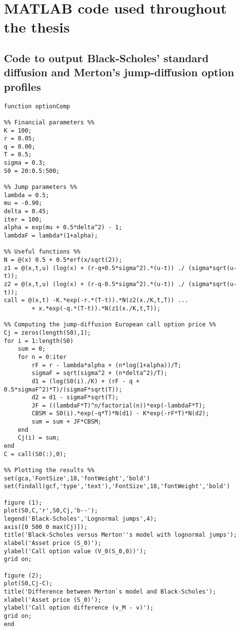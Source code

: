 \chapter{MATLAB code used throughout the thesis}

\section{Code to output Black-Scholes' standard diffusion and Merton's jump-diffusion option profiles}
\begin{lstlisting}
function optionComp

%% Financial parameters %%
K = 100;
r = 0.05;
q = 0.00;
T = 0.5;
sigma = 0.3;
S0 = 20:0.5:500;

%% Jump parameters %%
lambda = 0.5;
mu = -0.90;
delta = 0.45;
iter = 100;
alpha = exp(mu + 0.5*delta^2) - 1;
lambdaF = lambda*(1+alpha);

%% Useful functions %%
N = @(x) 0.5 + 0.5*erf(x/sqrt(2));
z1 = @(x,t,u) (log(x) + (r-q+0.5*sigma^2).*(u-t)) ./ (sigma*sqrt(u-t));
z2 = @(x,t,u) (log(x) + (r-q-0.5*sigma^2).*(u-t)) ./ (sigma*sqrt(u-t));
call = @(x,t) -K.*exp(-r.*(T-t)).*N(z2(x./K,t,T)) ...
        + x.*exp(-q.*(T-t)).*N(z1(x./K,t,T));

%% Computing the jump-diffusion European call option price %%
Cj = zeros(length(S0),1);
for i = 1:length(S0)
    sum = 0;
    for n = 0:iter
        rF = r - lambda*alpha + (n*log(1+alpha))/T;
        sigmaF = sqrt(sigma^2 + (n*delta^2)/T);
        d1 = (log(S0(i)./K) + (rF - q + 0.5*sigmaF^2)*T)/(sigmaF*sqrt(T));
        d2 = d1 - sigmaF*sqrt(T);
        JF = ((lambdaF*T)^n/factorial(n))*exp(-lambdaF*T);
        CBSM = S0(i).*exp(-q*T)*N(d1) - K*exp(-rF*T)*N(d2);
        sum = sum + JF*CBSM;
    end
    Cj(i) = sum;
end
C = call(S0(:),0);

%% Plotting the results %%
set(gca,'FontSize',18,'fontWeight','bold')
set(findall(gcf,'type','text'),'FontSize',18,'fontWeight','bold')

figure (1);
plot(S0,C,'r',S0,Cj,'b--');
legend('Black-Scholes','Lognormal jumps',4);
axis([0 500 0 max(Cj)]);
title('Black-Scholes versus Merton''s model with lognormal jumps');
xlabel('Asset price (S_0)');
ylabel('Call option value (V_0(S_0,0))');
grid on;

figure (2);
plot(S0,Cj-C);
title('Difference between Merton`s model and Black-Scholes');
xlabel('Asset price (S_0)');
ylabel('Call option difference (v_M - v)');
grid on;
end
\end{lstlisting}

